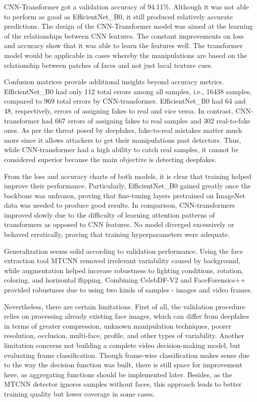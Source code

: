 \documentclass[12pt,a4paper]{report}
\begin{document}
CNN-Transformer got a validation accuracy of 94.11\%. Although it was not able to perform as good as EfficientNet\_B0, it still produced relatively accurate predictions. The design of the CNN-Transformer model was aimed at the learning of the relationships between CNN features. The constant improvements on loss and accuracy show that it was able to learn the features well. The transformer model would be applicable in cases whereby the manipulations are based on the relationship between patches of faces and not just local texture cues.

Confusion matrices provide additional insights beyond accuracy metrics. EfficientNet\_B0 had only 112 total errors among all samples, i.e., 16438 samples, compared to 969 total errors by CNN-transformer. EfficientNet\_B0 had 64 and 48, respectively, errors of assigning fakes to real and vice versa. In contrast, CNN-transformer had 667 errors of assigning fakes to real samples and 302 real-to-fake ones. As per the threat posed by deepfakes, fake-to-real mistakes matter much more since it allows attackers to get their manipulations past detectors. Thus, while CNN-transformer had a high ability to catch real samples, it cannot be considered superior because the main objective is detecting deepfakes.

From the loss and accuracy charts of both models, it is clear that training helped improve their performance. Particularly, EfficientNet\_B0 gained greatly once the backbone was unfrozen, proving that fine-tuning layers pretrained on ImageNet data was needed to produce good results. In comparison, CNN-transformers improved slowly due to the difficulty of learning attention patterns of transformers as opposed to CNN features. No model diverged excessively or behaved erratically, proving that training hyperparameters were adequate.

Generalization seems solid according to validation performance. Using the face extraction tool MTCNN removed irrelevant variability caused by background, while augmentation helped increase robustness to lighting conditions, rotation, coloring, and horizontal flipping. Combining CelebDF-V2 and FaceForensics++ provided robustness due to using two kinds of samples - images and video frames.

Nevertheless, there are certain limitations. First of all, the validation procedure relies on processing already existing face images, which can differ from deepfakes in terms of greater compression, unknown manipulation techniques, poorer resolution, occlusion, multi-face, profile, and other types of variability. Another limitation concerns not building a complete video decision-making model, but evaluating frame classification. Though frame-wise classification makes sense due to the way the decision function was built, there is still space for improvement here, as aggregating functions should be implemented later. Besides, as the MTCNN detector ignores samples without faces, this approach leads to better training quality but lower coverage in some cases.
\end{document}

